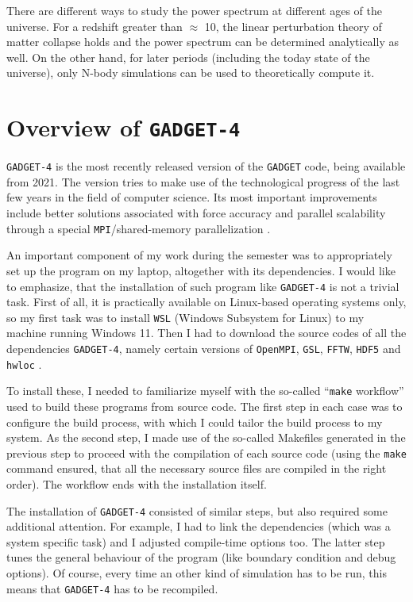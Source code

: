 \documentclass[12pt]{article}
\begin{document}
There are different ways to study the power spectrum at different ages of the universe. For a redshift greater than $\approx$ 10, the linear perturbation theory of matter collapse holds and the power spectrum can be determined analytically as well. On the other hand, for later periods (including the today state of the universe), only N-body simulations can be used to theoretically compute it.

\section{Overview of \texttt{GADGET-4}}
\texttt{GADGET-4} is the most recently released version of the \texttt{GADGET} code, being available from 2021. The version tries to make use of the technological progress of the last few years in the field of computer science. Its most important improvements include better solutions associated with force accuracy and parallel scalability through a special \texttt{MPI}/shared-memory parallelization \cite{Springel2021Gadget4}.

An important component of my work during the semester was to appropriately set up the program on my laptop, altogether with its dependencies. I would like to emphasize, that the installation of such program like \texttt{GADGET-4} is not a trivial task. First of all, it is practically available on Linux-based operating systems only, so my first task was to install \texttt{WSL} (Windows Subsystem for Linux) to my machine running Windows 11. Then I had to download the source codes of all the dependencies \texttt{GADGET-4}, namely certain versions of \texttt{OpenMPI}, \texttt{GSL}, \texttt{FFTW}, \texttt{HDF5} and \texttt{hwloc} \cite{masterdesky}.

To install these, I needed to familiarize myself with the so-called ``\texttt{make} workflow'' used to build these programs from source code. The first step in each case was to configure the build process, with which I could tailor the build process to my system. As the second step, I made use of the so-called Makefiles generated in the previous step to proceed with the compilation of each source code (using the \texttt{make} command ensured, that all the necessary source files are compiled in the right order). The workflow ends with the installation itself.

The installation of \texttt{GADGET-4} consisted of similar steps, but also required some additional attention. For example, I had to link the dependencies (which was a system specific task) and I adjusted compile-time options too. The latter step tunes the general behaviour of the program (like boundary condition and debug options). Of course, every time an other kind of simulation has to be run, this means that \texttt{GADGET-4} has to be recompiled.
\end{document}
